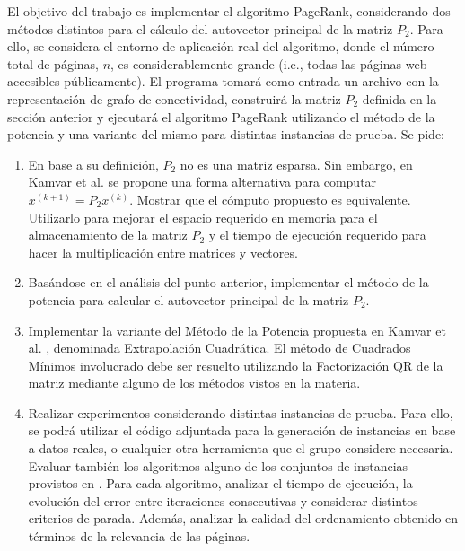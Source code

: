 El objetivo del trabajo es implementar el algoritmo PageRank, considerando dos m\'etodos distintos para el c\'alculo del
autovector principal de la matriz $P_2$. Para ello, se considera el entorno de aplicaci\'on real del algoritmo, donde el
n\'umero total de p\'aginas, $n$, es considerablemente grande (i.e., todas las p\'aginas web accesibles p\'ublicamente).
El programa tomar\'a como entrada un archivo con la representaci\'on de grafo de conectividad, construir\'a la matriz
$P_2$ definida en la secci\'on anterior y ejecutar\'a el algoritmo PageRank utilizando el m\'etodo de la potencia y una 
variante del mismo para distintas instancias de prueba. Se pide:

\begin{enumerate}
\item En base a su definici\'on, $P_2$ no es una matriz esparsa. Sin embargo, en Kamvar et al. \cite[Algoritmo
1]{Kamvar2003} se propone una forma alternativa para computar $x^{(k+1)} = P_2 x^{(k)}$. Mostrar que el c\'omputo
propuesto es equivalente. Utilizarlo para mejorar el espacio requerido en memoria para el almacenamiento de la matriz
$P_2$ y el tiempo de ejecuci\'on requerido para hacer la multiplicaci\'on entre matrices y vectores. 

\item Bas\'andose en el an\'alisis del punto anterior, implementar el m\'etodo de la potencia para calcular el
autovector principal de la matriz $P_2$.

\item Implementar la variante del M\'etodo de la Potencia propuesta en Kamvar et al. \cite[Secci\'on 5]{Kamvar2003},
denominada Extrapolaci\'on Cuadr\'atica. El m\'etodo de Cuadrados M\'inimos involucrado debe ser resuelto utilizando la
Factorizaci\'on QR de la matriz mediante alguno de los m\'etodos vistos en la materia.

\item Realizar experimentos considerando distintas instancias de prueba. Para ello, se podr\'a utilizar el c\'odigo
adjuntada para la generaci\'on de instancias en base a datos reales, o cualquier otra herramienta que el grupo considere
necesaria. Evaluar tambi\'en los algoritmos alguno de los conjuntos de instancias
provistos en \cite{SNAP}. Para cada algoritmo, analizar el tiempo de
ejecuci\'on, la evoluci\'on del error entre iteraciones consecutivas y considerar distintos criterios de parada. 
Adem\'as, analizar la calidad del ordenamiento obtenido en t\'erminos de la relevancia de las p\'aginas.
\end{enumerate}

